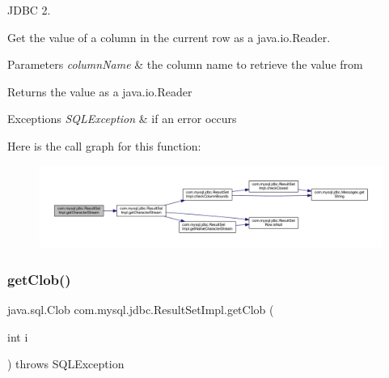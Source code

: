 J\+D\+BC 2.

Get the value of a column in the current row as a java.\+io.\+Reader. 


\begin{DoxyParams}{Parameters}
{\em column\+Name} & the column name to retrieve the value from\\
\hline
\end{DoxyParams}
\begin{DoxyReturn}{Returns}
the value as a java.\+io.\+Reader
\end{DoxyReturn}

\begin{DoxyExceptions}{Exceptions}
{\em S\+Q\+L\+Exception} & if an error occurs \\
\hline
\end{DoxyExceptions}
Here is the call graph for this function\+:
\nopagebreak
\begin{figure}[H]
\begin{center}
\leavevmode
\includegraphics[width=350pt]{classcom_1_1mysql_1_1jdbc_1_1_result_set_impl_aba214197b5cf31aa7baee241a2ce91a2_cgraph}
\end{center}
\end{figure}
\mbox{\label{classcom_1_1mysql_1_1jdbc_1_1_result_set_impl_a9a0298e829cc6e29bf17f112e310dc0b}} 
\subsubsection{\texorpdfstring{get\+Clob()}{getClob()}\hspace{0.1cm}{\footnotesize\ttfamily [1/2]}}
{\footnotesize\ttfamily java.\+sql.\+Clob com.\+mysql.\+jdbc.\+Result\+Set\+Impl.\+get\+Clob (\begin{DoxyParamCaption}\item[{int}]{i }\end{DoxyParamCaption}) throws S\+Q\+L\+Exception}

